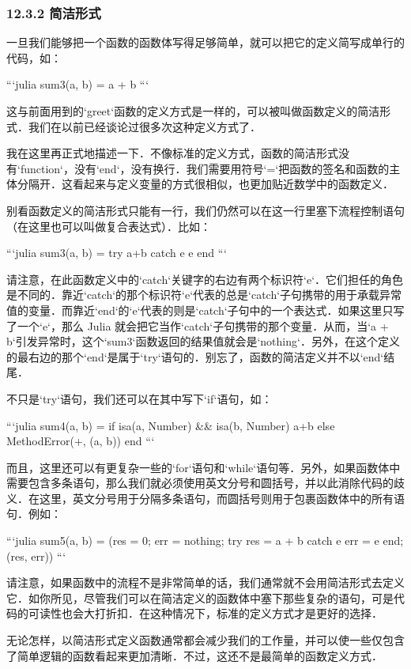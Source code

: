\subsubsection{12.3.2 简洁形式}

一旦我们能够把一个函数的函数体写得足够简单，就可以把它的定义简写成单行的代码，如：

```julia
sum3(a, b) = a + b
```

这与前面用到的`greet`函数的定义方式是一样的，可以被叫做函数定义的简洁形式．我们在以前已经谈论过很多次这种定义方式了．
 
我在这里再正式地描述一下．不像标准的定义方式，函数的简洁形式没有`function`，没有`end`，没有换行．我们需要用符号`=`把函数的签名和函数的主体分隔开．这看起来与定义变量的方式很相似，也更加贴近数学中的函数定义．

别看函数定义的简洁形式只能有一行，我们仍然可以在这一行里塞下流程控制语句（在这里也可以叫做复合表达式）．比如：

```julia
sum3(a, b) = try a+b catch e e end
```

请注意，在此函数定义中的`catch`关键字的右边有两个标识符`e`．它们担任的角色是不同的．靠近`catch`的那个标识符`e`代表的总是`catch`子句携带的用于承载异常值的变量．而靠近`end`的`e`代表的则是`catch`子句中的一个表达式．如果这里只写了一个`e`，那么 Julia 就会把它当作`catch`子句携带的那个变量．从而，当`a + b`引发异常时，这个`sum3`函数返回的结果值就会是`nothing`．另外，在这个定义的最右边的那个`end`是属于`try`语句的．别忘了，函数的简洁定义并不以`end`结尾．

不只是`try`语句，我们还可以在其中写下`if`语句，如：

```julia
sum4(a, b) = if isa(a, Number) && isa(b, Number) a+b else MethodError(+, (a, b)) end 
```

而且，这里还可以有更复杂一些的`for`语句和`while`语句等．另外，如果函数体中需要包含多条语句，那么我们就必须使用英文分号和圆括号，并以此消除代码的歧义．在这里，英文分号用于分隔多条语句，而圆括号则用于包裹函数体中的所有语句．例如：

```julia
sum5(a, b) = (res = 0; err = nothing; try res = a + b catch e err = e end; (res, err))
```

请注意，如果函数中的流程不是非常简单的话，我们通常就不会用简洁形式去定义它．如你所见，尽管我们可以在简洁定义的函数体中塞下那些复杂的语句，可是代码的可读性也会大打折扣．在这种情况下，标准的定义方式才是更好的选择．

无论怎样，以简洁形式定义函数通常都会减少我们的工作量，并可以使一些仅包含了简单逻辑的函数看起来更加清晰．不过，这还不是最简单的函数定义方式．

